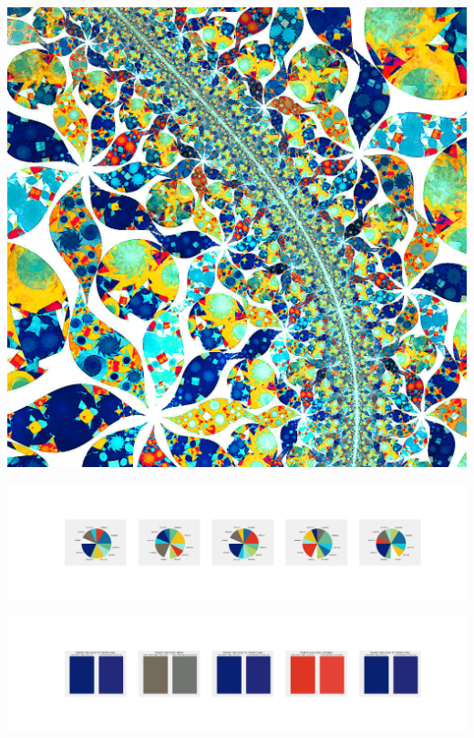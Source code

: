 \documentclass[11pt]{article}
\begin{document}
\begin{landscape}
    \begin{center}
    \includegraphics[width=\textwidth]{./nbimg/file (425).jpg}
    \end{center}

    \begin{center}
    \includegraphics[width=250mm]{./nbimg/pie-362.jpg}
    \end{center}

    \begin{center}
    \includegraphics[width=250mm]{./nbimg/peak-362.jpg}
    \end{center}
    


\end{landscape}
\end{document}
